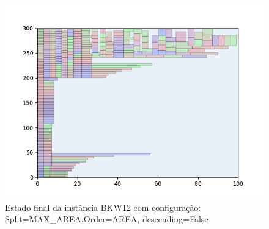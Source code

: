 \begin{figure}[H]
    \centering
    \caption[]{Estado final da instância BKW12 com configuração: Split=MAX_AREA,Order=AREA, descending=False}
    \label{fig:bkw12-max_area-area-false}
    \includegraphics[scale=0.5]{output/figures/bkw/bkw12/max_area/area/false/000}
\end{figure}